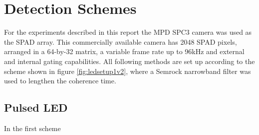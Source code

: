 \documentclass[]{article}
\begin{document}
\section{Detection Schemes}
	For the experiments described in this report the MPD SPC3 camera was used as the SPAD array. This commercially available camera has 2048 SPAD pixels, arranged in a 64-by-32 matrix, a variable frame rate up to 96kHz and external and internal gating capabilities. All following methods are set up according to the scheme shown in figure \ref{fig:ledsetup1v2}, where a Semrock narrowband filter was used to lengthen the coherence time.
	
\subsection{Pulsed LED}\label{scheme1}
	In the first scheme
	
\clearpage


\end{document}

